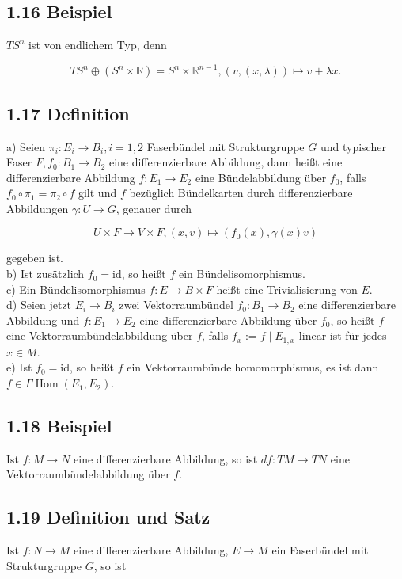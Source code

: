 \documentclass[10pt, letterpaper]{article}
\begin{document}
\subsection*{1.16 Beispiel}
$T S^{n}$ ist von endlichem Typ, denn

$$
T S^{n} \oplus\left(S^{n} \times \mathbb{R}\right)=S^{n} \times \mathbb{R}^{n-1},(v,(x, \lambda)) \mapsto v+\lambda x .
$$

\subsection*{1.17 Definition}
a) Seien $\pi_{i}: E_{i} \rightarrow B_{i}, i=1,2$ Faserbündel mit Strukturgruppe $G$ und typischer Faser $F, f_{0}: B_{1} \rightarrow B_{2}$ eine differenzierbare Abbildung, dann heißt eine differenzierbare Abbildung $f: E_{1} \rightarrow E_{2}$ eine Bündelabbildung über $f_{0}$, falls $f_{0} \circ \pi_{1}=\pi_{2} \circ f$ gilt und $f$ bezüglich Bündelkarten durch differenzierbare Abbildungen $\gamma: U \rightarrow G$, genauer durch

$$
U \times F \rightarrow V \times F,(x, v) \mapsto\left(f_{0}(x), \gamma(x) v\right)
$$

gegeben ist.\\
b) Ist zusätzlich $f_{0}=\mathrm{id}$, so heißt $f$ ein Bündelisomorphismus.\\
c) Ein Bündelisomorphismus $f: E \rightarrow B \times F$ heißt eine Trivialisierung von $E$.\\
d) Seien jetzt $E_{i} \rightarrow B_{i}$ zwei Vektorraumbündel $f_{0}: B_{1} \rightarrow B_{2}$ eine differenzierbare Abbildung und $f: E_{1} \rightarrow E_{2}$ eine differenzierbare Abbildung über $f_{0}$, so heißt $f$ eine Vektorraumbündelabbildung über $f$, falls $f_{x}:=f \mid E_{1, x}$ linear ist für jedes $x \in M$.\\
e) Ist $f_{0}=\mathrm{id}$, so heißt $f$ ein Vektorraumbündelhomomorphismus, es ist dann $f \in \Gamma \operatorname{Hom}\left(E_{1}, E_{2}\right)$.

\subsection*{1.18 Beispiel}
Ist $f: M \rightarrow N$ eine differenzierbare Abbildung, so ist $d f: T M \rightarrow T N$ eine Vektorraumbündelabbildung über $f$.

\subsection*{1.19 Definition und Satz}
Ist $f: N \rightarrow M$ eine differenzierbare Abbildung, $E \rightarrow M$ ein Faserbündel mit Strukturgruppe $G$, so ist
\end{document}
